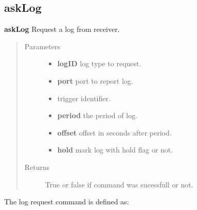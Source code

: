 \subsection{askLog}
\noindent {}\textbf{askLog}
Request a log from receiver.
\begin{quote}\begin{description}
		\item[{Parameters}] \leavevmode
		\begin{itemize}
			\item \textbf{logID} \textendash{} log type to request.
			
			\item \textbf{port} \textendash{} port to report log.
			
			\item {} 
			 \textendash{} trigger identifier.
			
			\item \textbf{period} \textendash{} the period of log.
			
			\item \textbf{offset} \textendash{} offset in seconds after period.
			
			\item \textbf{hold} \textendash{} mark log with hold flag or not.
			
		\end{itemize}
		
		\item[{Returns}] \leavevmode
		True or false if command was sucessfull or not.
		
\end{description}\end{quote}

The log request command is defined as:




